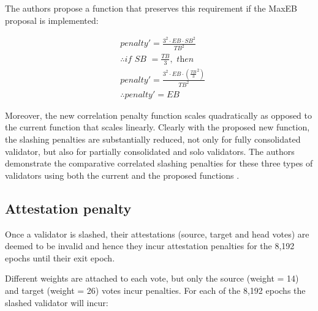 \documentclass{article}
\begin{document}
The authors propose a function that preserves this requirement if the MaxEB
proposal is implemented:

\begin{equation*}
  \begin{split}
& penalty' = \frac{3^2 \cdot  EB \cdot  SB^2}{TB^2} \\
& \therefore \textit{if SB } = \frac{TB}{3}, \textit{ then} \\
& penalty' =   \frac{3^2 \cdot  EB \cdot  \left(  \frac{TB}{3}^2 \right) }{TB^2} \\
& \therefore penalty' = EB
  \end{split}
\end{equation*}

Moreover, the new correlation penalty function scales quadratically as opposed
to the current function that scales linearly. Clearly with the proposed new
function, the slashing penalties are substantially reduced, not only for fully
consolidated validator, but also for partially consolidated and solo
validators. The authors demonstrate the comparative correlated slashing
penalties for these three types of validators using both the current and the
proposed functions \cite{Neuder2023d}.

\subsection{Attestation penalty}
Once a validator is slashed, their attestations (source, target and head votes)
are deemed to be invalid and hence they incur attestation penalties for the
8,192 epochs until their exit epoch. 

Different weights are attached to each vote, but only the source (weight = 14)
and target (weight = 26) votes incur penalties. For each of the 8,192 epochs
the slashed validator will incur:
\end{document}
